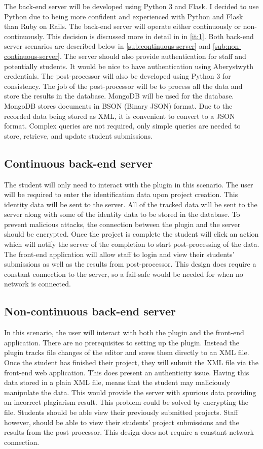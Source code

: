 The back-end server will be developed using Python 3 and Flask. I decided to use Python due to being more confident and experienced with Python and Flask than Ruby on Rails. The back-end server will operate either continuously or non-continuously. This decision is discussed more in detail in  in \autoref{it:1}. Both back-end server scenarios are described below in \autoref{sub:continuous-server} and \autoref{sub:non-continuous-server}. The server should also provide authentication for staff and potentially students. It would be nice to have authentication using Aberystwyth credentials. The post-processor will also be developed using Python 3 for consistency. The job of the post-processor will be to process all the data and store the results in the database. MongoDB will be used for the database. MongoDB stores documents in BSON (Binary JSON) format. Due to the recorded data being stored as XML, it is convenient to convert to a JSON format. Complex queries are not required, only simple queries are needed to store, retrieve, and update student submissions.

\subsection{Continuous back-end server}
\label{sub:continuous-server}
The student will only need to interact with the plugin in this scenario. The user will be required to enter the identification data upon project creation. This identity data will be sent to the server. All of the tracked data will be sent to the server along with some of the identity data to be stored in the database. To prevent malicious attacks, the connection between the plugin and the server should be encrypted. Once the project is complete the student will click an action which will notify the server of the completion to start post-processing of the data. The front-end application will allow staff to login and view their students' submissions as well as the results from post-processor. This design does require a constant connection to the server, so a fail-safe would be needed for when no network is connected.

\subsection{Non-continuous back-end server}
\label{sub:non-continuous-server}
In this scenario, the user will interact with both the plugin and the front-end application. There are no prerequisites to setting up the plugin. Instead the plugin tracks file changes of the editor and saves them directly to an XML file. Once the student has finished their project, they will submit the XML file via the front-end web application. This does present an authenticity issue. Having this data stored in a plain XML file, means that the student may maliciously manipulate the data. This would provide the server with spurious data providing an incorrect plagiarism result. This problem could be solved by encrypting the file. Students should be able view their previously submitted projects. Staff however, should be able to view their students' project submissions and the results from the post-processor. This design does not require a constant network connection.

